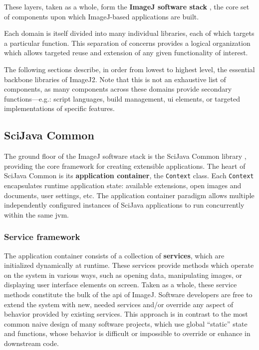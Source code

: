 \documentclass{bmcart}
\begin{document}
These layers, taken as a whole, form the \textbf{ImageJ software stack}
\cite{imagej_architecture}, the core set of components upon which ImageJ-based
applications are built.

Each domain is itself divided into many individual libraries, each of which
targets a particular function. This separation of concerns provides a logical
organization which allows targeted reuse and extension of any given
functionality of interest.

The following sections describe, in order from lowest to highest level, the
essential backbone libraries of ImageJ2. Note that this is not an exhaustive
list of components, as many components across these domains provide secondary
functions---e.g.: script languages, build management, \acrshort{ui} elements,
or targeted implementations of specific features.

\subsection*{SciJava Common}
The ground floor of the ImageJ software stack is the SciJava Common library
\cite{imagej_sjc}, providing the core framework for creating extensible
applications. The heart of SciJava Common is its \textbf{application
container}, the \texttt{Context} class. Each \texttt{Context} encapsulates
runtime application state: available extensions, open images and documents,
user settings, etc. The application container paradigm allows multiple
independently configured instances of SciJava applications to run concurrently
within the same \acrfull{jvm}.

\subsubsection*{Service framework}
The application container consists of a collection of \textbf{services}, which
are initialized dynamically at runtime. These services provide methods which
operate on the system in various ways, such as opening data, manipulating
images, or displaying user interface elements on screen. Taken as a whole,
these service methods constitute the bulk of the \acrfull{api} of ImageJ.
Software developers are free to extend the system with new, needed services
and/or override any aspect of behavior provided by existing services. This
approach is in contrast to the most common naive design of many software
projects, which use global ``static'' state and functions, whose behavior is
difficult or impossible to override or enhance in downstream code.
\end{document}
